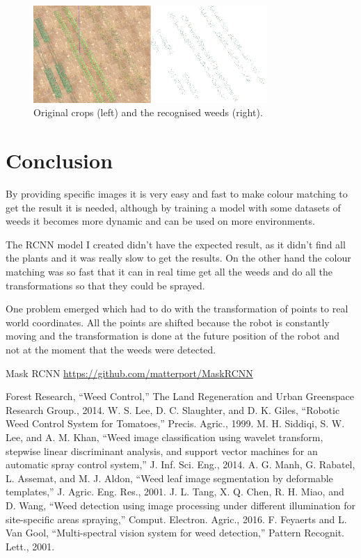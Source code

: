 \documentclass[journal]{IEEEtran}
\begin{document}
\begin{figure}[ht]
\includegraphics[width=3.5in]{allweeds}
\caption{Original crops (left) and the recognised weeds (right).}
\label{all_weeds}
\end{figure}



\section{Conclusion}
By providing specific images it is very easy and fast to make colour matching to get the result it is needed, although by training a model with some datasets of weeds it becomes more dynamic and can be used on more environments.

The RCNN model I created didn't have the expected result, as it didn't find all the plants and it was really slow to get the results. On the other hand the colour matching was so fast that it can in real time get all the weeds and do all the transformations so that they could be sprayed.

One problem emerged which had to do with the transformation of points to real world coordinates. All the points are shifted because the robot is constantly moving and the transformation is done at the future position of the robot and not at the moment that the weeds were detected.




\begin{thebibliography}{}
Mask RCNN \url{https://github.com/matterport/MaskRCNN}

Forest Research, “Weed Control,” The Land Regeneration and Urban Greenspace Research Group., 2014.
W. S. Lee, D. C. Slaughter, and D. K. Giles, “Robotic Weed Control System for Tomatoes,” Precis. Agric., 1999.
M. H. Siddiqi, S. W. Lee, and A. M. Khan, “Weed image classification using wavelet transform, stepwise linear discriminant analysis, and support vector machines for an automatic spray control system,” J. Inf. Sci. Eng., 2014.
A. G. Manh, G. Rabatel, L. Assemat, and M. J. Aldon, “Weed leaf image segmentation by deformable templates,” J. Agric. Eng. Res., 2001.
J. L. Tang, X. Q. Chen, R. H. Miao, and D. Wang, “Weed detection using image processing under different illumination for site-specific areas spraying,” Comput. Electron. Agric., 2016.
F. Feyaerts and L. Van Gool, “Multi-spectral vision system for weed detection,” Pattern Recognit. Lett., 2001.
\end{thebibliography}
\end{document}

